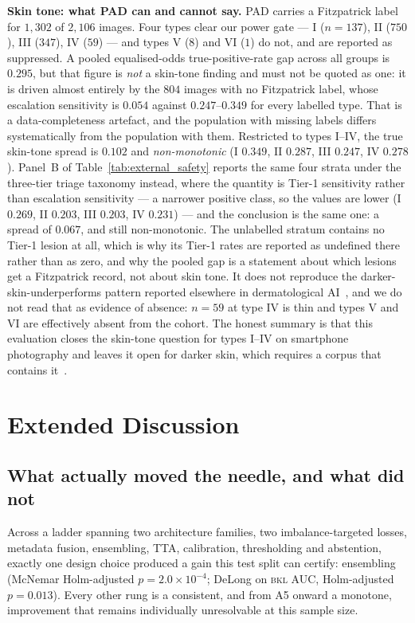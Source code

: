 \documentclass[journal]{IEEEtran}
\begin{document}
\textbf{Skin tone: what PAD can and cannot say.} PAD carries a Fitzpatrick label for $1{,}302$
of $2{,}106$ images. Four types clear our power gate --- I ($n=137$), II ($750$), III ($347$),
IV ($59$) --- and types V ($8$) and VI ($1$) do not, and are reported as suppressed. A pooled
equalised-odds true-positive-rate gap across all groups is $0.295$, but that figure is
\emph{not} a skin-tone finding and must not be quoted as one: it is driven almost entirely by
the $804$ images with no Fitzpatrick label, whose escalation sensitivity is $0.054$ against
$0.247$--$0.349$ for every labelled type. That is a data-completeness artefact, and the
population with missing labels differs systematically from the population with them.
Restricted to types I--IV, the true skin-tone spread is $0.102$ and \emph{non-monotonic}
(I $0.349$, II $0.287$, III $0.247$, IV $0.278$). Panel~B of
Table~\ref{tab:external_safety} reports the same four strata under the three-tier triage
taxonomy instead, where the quantity is Tier-1 sensitivity rather than escalation
sensitivity --- a narrower positive class, so the values are lower (I $0.269$, II $0.203$,
III $0.203$, IV $0.231$) --- and the conclusion is the same one: a spread of $0.067$, and
still non-monotonic. The unlabelled stratum contains no Tier-1 lesion at all, which is why
its Tier-1 rates are reported as undefined there rather than as zero, and why the pooled gap
is a statement about which lesions get a Fitzpatrick record, not about skin tone. It does not
reproduce the
darker-skin-underperforms pattern reported elsewhere in dermatological
AI~\cite{daneshjou2022disparities}, and we do not read that as evidence of absence: $n=59$ at
type IV is thin and types V and VI are effectively absent from the cohort. The honest summary
is that this evaluation closes the skin-tone question for types I--IV on smartphone
photography and leaves it open for darker skin, which requires a corpus that
contains it~\cite{groh2021fitzpatrick17k}.


\section{Extended Discussion}
\label{app:extdiscussion}

\subsection{What actually moved the needle, and what did not}
Across a ladder spanning two architecture families, two imbalance-targeted losses, metadata
fusion, ensembling, TTA, calibration, thresholding and abstention, exactly one design choice
produced a gain this test split can certify: ensembling (McNemar Holm-adjusted
$p=2.0\times10^{-4}$; DeLong on \textsc{bkl} AUC, Holm-adjusted $p=0.013$). Every other rung
is a consistent, and from A5 onward a monotone, improvement that remains individually
unresolvable at this sample size.
\end{document}

